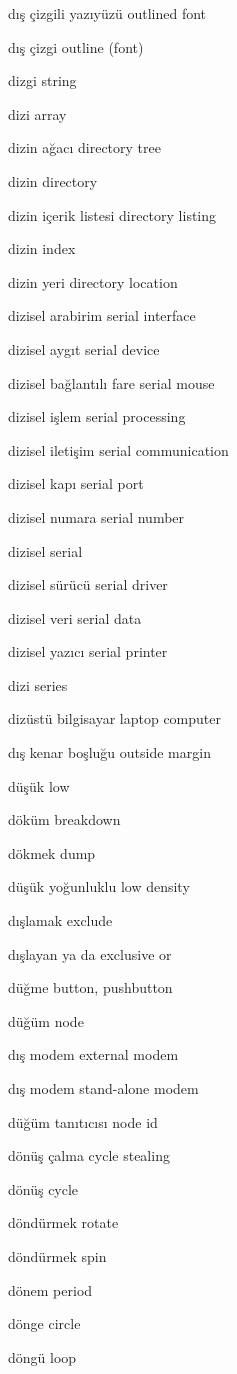 \documentclass[12pt,fleqn]{article}\usepackage{../../common}
\begin{document}
dış çizgili yazıyüzü outlined font

dış çizgi outline (font)

dizgi string

dizi array

dizin ağacı directory tree

dizin directory

dizin içerik listesi directory listing

dizin index

dizin yeri directory location

dizisel arabirim serial interface

dizisel aygıt serial device

dizisel bağlantılı fare serial mouse

dizisel işlem serial processing

dizisel iletişim serial communication

dizisel kapı serial port

dizisel numara serial number

dizisel serial

dizisel sürücü serial driver

dizisel veri serial data

dizisel yazıcı serial printer

dizi series

dizüstü bilgisayar laptop computer

dış kenar boşluğu outside margin

düşük low

döküm breakdown

dökmek dump

düşük yoğunluklu low density

dışlamak exclude

dışlayan ya da exclusive or

düğme button, pushbutton

düğüm node

dış modem external modem

dış modem stand-alone modem

düğüm tanıtıcısı node id

dönüş çalma cycle stealing

dönüş cycle

döndürmek rotate

döndürmek spin

dönem period

dönge circle

döngü loop
\end{document}
